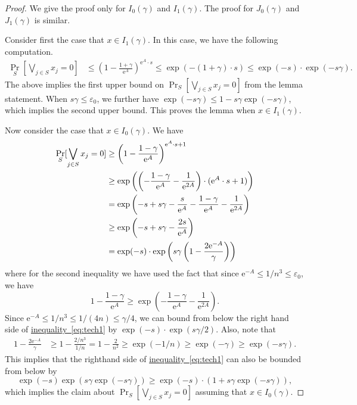 \documentclass[11pt]{article}
\numberwithin{equation}{section}
\theoremstyle{definition}
\theoremstyle{plain}
\newcommand{\eee}{\mathrm e}
\newcommand{\expeqref}[2]{\hyperref[#2]{#1~\eqref{#2}}}
\newcommand{\prob}[2]{\mathop{\mathrm{Pr}}_{#1}[#2]}
\begin{document}
\begin{proof}
We give the proof only for $I_0(\gamma)$ and $I_1(\gamma)$. The proof for $J_0(\gamma)$ and $J_1(\gamma)$ is similar.

Consider first the case that $x\in I_1(\gamma)$. In this case, we have the following computation. 
\begin{align}
\prob{S}{\bigvee_{j\in S} x_j = 0} &\leq \left(1-\frac{1+\gamma}{\eee^A}\right)^{\eee^A\cdot s}
%
%
\leq \exp(-(1+\gamma)\cdot s) \leq \exp(-s)\cdot \exp(-s\gamma).\label{eq:tech2}
\end{align}
The above implies the first upper bound on $\prob{S}{\bigvee_{j\in S} x_j = 0}$ from the lemma statement. When $s\gamma\leq \varepsilon_0$, we further have $\exp(-s\gamma) \leq 1-s\gamma \exp(-s\gamma)$, which implies the second upper bound. This proves the lemma when $x\in I_1(\gamma)$.

Now consider the case that $x\in I_0(\gamma)$. We have
\begin{align}
  \prob{S}{\bigvee_{j\in S}x_j = 0} &\geq \left(1-\frac{1-\gamma}{\eee^A}\right)^{\eee^A\cdot s + 1}\notag\\
                                    &\geq \exp\left(\left(-\frac{1-\gamma}{\eee^A} - \frac{1}{\eee^{2A}}\right)\cdot (\eee^A\cdot s+1)\right)\notag\\
                                    &= \exp\left(-s+s\gamma -\frac{s}{\eee^A}-\frac{1-\gamma}{\eee^A} - \frac{1}{\eee^{2A}}\right)\notag\\
                                    &\geq \exp\left(-s+s\gamma -\frac{2s}{\eee^A}\right)\notag\\
                                    &= \exp(-s)\cdot \exp\left(s\gamma\left(1-\frac{2\eee^{-A}}{\gamma}\right)\right)\label{eq:tech1}
\end{align}
where for the second inequality we have used the fact that since $\eee^{-A} \leq {1}/{n^3}\leq \varepsilon_0$, we have
\[
  1- \frac{1-\gamma}{\eee^A}\geq \exp\left(-\frac{1-\gamma}{\eee^A} - \frac{1}{\eee^{2A}}\right).
\]
Since $\eee^{-A}\leq {1}/{n^3}\leq {1}/{(4n)}\leq \gamma/4$,
we can
%
%
bound from below
%
the right hand side of \expeqref{inequality}{eq:tech1} by $\exp(-s)\cdot \exp(s\gamma/2)$. Also, note that 
\begin{align*}
1-\frac{2\eee^{-A}}{\gamma} &\geq 1-\frac{2/n^3}{1/n}= 1-\frac{2}{n^2}
\geq \exp(-1/n) \geq \exp(-\gamma)\geq \exp(-s\gamma).
\end{align*}
This implies that the righthand side of \expeqref{inequality}{eq:tech1} can also be bounded from below by
\[
  \exp(-s)\exp(s\gamma\exp(-s\gamma)) \geq \exp(-s)\cdot(1+s\gamma\exp(-s\gamma)),
\]
which implies the claim about $\prob{S}{\bigvee_{j\in S} x_j = 0}$
assuming that $x\in I_0(\gamma)$.
\end{proof}
\end{document}
